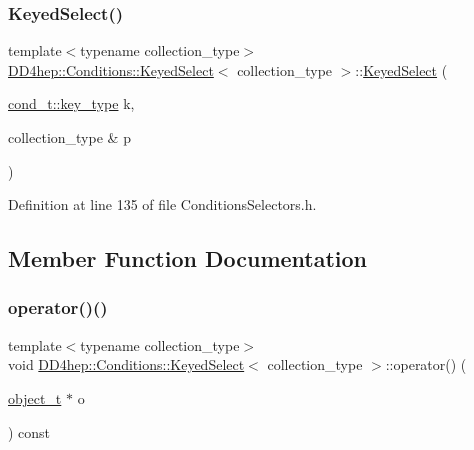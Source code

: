 \subsubsection{\texorpdfstring{Keyed\+Select()}{KeyedSelect()}}
{\footnotesize\ttfamily template$<$typename collection\+\_\+type$>$ \\
\hyperlink{class_d_d4hep_1_1_conditions_1_1_keyed_select}{D\+D4hep\+::\+Conditions\+::\+Keyed\+Select}$<$ collection\+\_\+type $>$\+::\hyperlink{class_d_d4hep_1_1_conditions_1_1_keyed_select}{Keyed\+Select} (\begin{DoxyParamCaption}\item[{\hyperlink{class_d_d4hep_1_1_conditions_1_1_condition_a7528efa762e8cc072ef80ea67c3531f9}{cond\+\_\+t\+::key\+\_\+type}}]{k,  }\item[{collection\+\_\+type \&}]{p }\end{DoxyParamCaption})\hspace{0.3cm}{\ttfamily [inline]}}



Definition at line 135 of file Conditions\+Selectors.\+h.



\subsection{Member Function Documentation}
\hypertarget{class_d_d4hep_1_1_conditions_1_1_keyed_select_afd27ff9c2eb4d46c07ff631eb852da6b}{}\label{class_d_d4hep_1_1_conditions_1_1_keyed_select_afd27ff9c2eb4d46c07ff631eb852da6b} 
\subsubsection{\texorpdfstring{operator()()}{operator()()}\hspace{0.1cm}{\footnotesize\ttfamily [1/4]}}
{\footnotesize\ttfamily template$<$typename collection\+\_\+type$>$ \\
void \hyperlink{class_d_d4hep_1_1_conditions_1_1_keyed_select}{D\+D4hep\+::\+Conditions\+::\+Keyed\+Select}$<$ collection\+\_\+type $>$\+::operator() (\begin{DoxyParamCaption}\item[{\hyperlink{class_d_d4hep_1_1_conditions_1_1_cond_____oper_a4229491e49bfd21058dff10125a73f63}{object\+\_\+t} $\ast$}]{o }\end{DoxyParamCaption}) const\hspace{0.3cm}{\ttfamily [inline]}}



